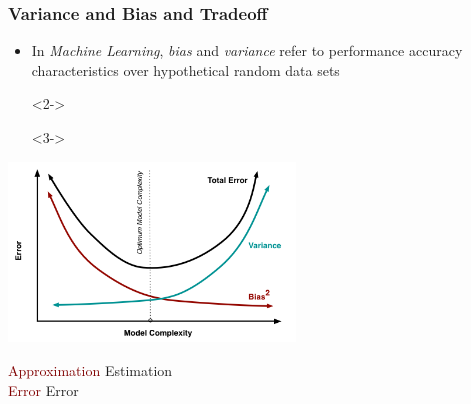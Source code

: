 \documentclass[xcolor={dvipsnames}]{beamer}
\begin{document}
\frame
{
\frametitle{Variance and Bias and Tradeoff}

\begin{itemize}
\item In \emph{Machine Learning}, \emph{bias} and \emph{variance}
refer to performance accuracy characteristics over hypothetical random data sets
\item[]<2-> \color{NavyBlue}{Model Complexity: too simple$=$bias \& too flexible$=$variance}
\item[]<3-> \color{Maroon}{The Machine Learning  objective is finding the right balance}
\item[]
\end{itemize}

\hspace*{-1.1cm}\includegraphics[width=3in]{stuff/biasvariance.png}

\vspace{-.9in}\scriptsize
\hspace{2.05in}\textcolor{Maroon}{Approximation} \hspace{.9in}\textcolor{Emerald}{Estimation}\\  
\hspace{2.3in}\textcolor{Maroon}{Error} \hspace{1.25in}\textcolor{Emerald}{Error}  

\vspace{.75in}
}
\end{document}
